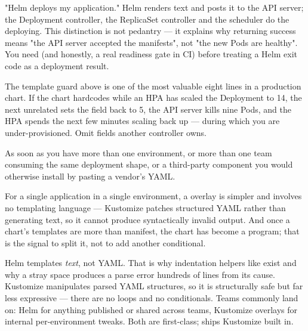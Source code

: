 \begin{misconception}
"Helm deploys my application." Helm renders text and posts it to the API server; the Deployment controller, the ReplicaSet controller and the scheduler do the deploying. This distinction is not pedantry --- it explains why  returning success means "the API server accepted the manifests", not "the new Pods are healthy". You need  (and honestly, a real readiness gate in CI) before treating a Helm exit code as a deployment result.
\end{misconception}

\begin{seniornote}
The  template guard above is one of the most valuable eight lines in a production chart. If the chart hardcodes  while an HPA has scaled the Deployment to 14, the next unrelated  sets the field back to 5, the API server kills nine Pods, and the HPA spends the next few minutes scaling back up --- during which you are under-provisioned. Omit fields another controller owns.
\end{seniornote}

 As soon as you have more than one environment, or more than one team consuming the same deployment shape, or a third-party component you would otherwise install by pasting a vendor's YAML.

 For a single application in a single environment, a  overlay is simpler and involves no templating language --- Kustomize patches structured YAML rather than generating text, so it cannot produce syntactically invalid output. And once a chart's templates are more  than manifest, the chart has become a program; that is the signal to split it, not to add another conditional.

\begin{tradeoff}
Helm templates \emph{text}, not YAML. That is why indentation helpers like  exist and why a stray space produces a parse error hundreds of lines from its cause. Kustomize manipulates parsed YAML structures, so it is structurally safe but far less expressive --- there are no loops and no conditionals. Teams commonly land on: Helm for anything published or shared across teams, Kustomize overlays for internal per-environment tweaks. Both are first-class;  ships Kustomize built in.
\end{tradeoff}


